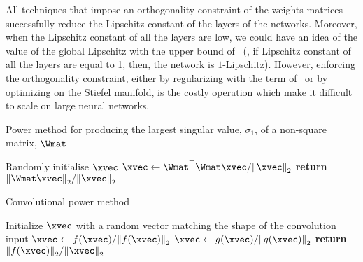 All techniques that impose an orthogonality constraint of the weights matrices successfully reduce the Lipschitz constant of the layers of the networks.
Moreover, when the Lipschitz constant of all the layers are low, we could have an idea of the value of the global Lipschitz with the upper bound of~ (\ie, if Lipschitz constant of all the layers are equal to 1, then, the network is $1$-Lipschitz).
However, enforcing the orthogonality constraint, either by regularizing with the term of~ or by optimizing on the Stiefel manifold, is the costly operation which make it difficult to scale on large neural networks.




\begin{algorithm}[tb]
  \caption{Power method for producing the largest singular value, $\sigma_1$, of a non-square matrix, $\Wmat$ \cite{gouk2018regularisation,golub2000eigenvalue}}
  \begin{algorithmic}[1]
    \State Randomly initialise $\xvec$
      \State $\xvec \gets \Wmat^\top \Wmat \xvec / \norm{\xvec}_2$
    \EndFor
    \State \textbf{return} $\norm{\Wmat \xvec}_2 / \norm{\xvec}_2$
  \end{algorithmic}
  \label{algorithm:ch3-power_method}
\end{algorithm}

\begin{algorithm}[tb]
  \caption{Convolutional power method \cite{farnia2018generalizable}}
  \begin{algorithmic}[1]
    \State Initialize $\xvec$ with a random vector matching the shape of the convolution input
      \State $\xvec \gets f(\xvec) / \norm{f(\xvec)}_2 $
      \State $\xvec \gets g(\xvec) / \norm{g(\xvec)}_2$
    \EndFor
    \State \textbf{return} $\norm{f(\xvec)}_2 / \norm{\xvec}_2$
  \end{algorithmic}
  \label{algorithm:ch3-power_method_generic}
\end{algorithm}


